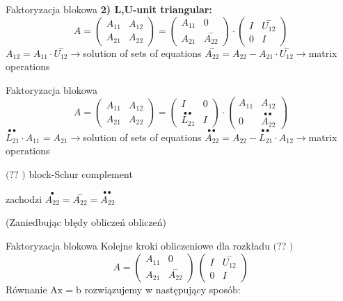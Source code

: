 \begin{frame}{Faktoryzacja blokowa}
\textbf{2) L,U-unit triangular:}
$$
A=\left(\begin{array}{ll}
A_{11} & A_{12}\\
A_{21} & A_{22}
\end{array}\right)=\left(\begin{array}{ll}
A_{11} & 0\\
A_{21} & \overset{-}{A_{22}}
\end{array}\right)\cdot \left(\begin{array}{ll}
I & \overset{-}{U_{12}}\\
0 & I
\end{array}\right)
$$
$ A_{12}=A_{11}\cdot \overset{-}{U_{12}}\rightarrow$solution of sets of equations $ \overset{-}{A_{22}}=A_{22}-A_{21}\cdot \overset{-}{U_{12}}\rightarrow$matrix operations

\end{frame}
\begin{frame}{Faktoryzacja blokowa}
$$
A=\left(\begin{array}{ll}
A_{11} & A_{12}\\
A_{21} & A_{22}
\end{array}\right)=\left(\begin{array}{ll}
I & 0\\
\overset{\bullet \bullet}{L_{21}} & I
\end{array}\right)\cdot \left(\begin{array}{ll}
A_{11} & A_{12}\\
 0 & \overset{\bullet \bullet}{A_{22}}
\end{array}\right)
$$
$ \overset{\bullet \bullet}{L_{21}}\cdot A_{11}=A_{21}\rightarrow$solution of sets of equations $ \overset{\bullet \bullet}{A_{22}}=A_{22}-\overset{\bullet \bullet}{L_{21}}\cdot A_{12}\rightarrow$matrix operations

$($?? $)$ block-Schur complement

zachodzi $\overset{\bullet}{A_{22}}=\overset{-}{A_{22}}=\overset{\bullet \bullet}{A_{22}}$

(Zaniedbując błędy obliczeń obliczeń)
\end{frame}
\begin{frame}{Faktoryzacja blokowa}
Kolejne kroki obliczeniowe dla rozkładu $($?? $)$
$$
A=\left(\begin{array}{ll}
A_{11} & 0\\
A_{21} & \overset{-}{A_{22}}
\end{array}\right)\ \left(\begin{array}{ll}
I & \overset{-}{U_{12}}\\
0 & I
\end{array}\right)
$$
Równanie $\mathrm{A}\mathrm{x}=\mathrm{b}$ rozwiązujemy w następujący sposób: 



\end{frame}
